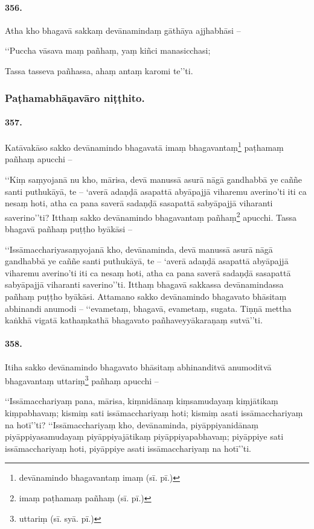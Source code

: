 \paragraph{356.} Atha kho bhagavā sakkaṃ devānamindaṃ gāthāya ajjhabhāsi –

‘‘Puccha vāsava maṃ pañhaṃ, yaṃ kiñci manasicchasi;

Tassa tasseva pañhassa, ahaṃ antaṃ karomi te’’ti.

\subsubsection{Paṭhamabhāṇavāro niṭṭhito.}

\paragraph{357.} Katāvakāso sakko devānamindo bhagavatā imaṃ bhagavantaṃ\footnote{devānamindo bhagavantaṃ imaṃ (sī. pī.)} paṭhamaṃ pañhaṃ apucchi –

‘‘Kiṃ saṃyojanā nu kho, mārisa, devā manussā asurā nāgā gandhabbā ye caññe santi puthukāyā, te – ‘averā adaṇḍā asapattā abyāpajjā viharemu averino’ti iti ca nesaṃ hoti, atha ca pana saverā sadaṇḍā sasapattā sabyāpajjā viharanti saverino’’ti? Itthaṃ sakko devānamindo bhagavantaṃ pañhaṃ\footnote{imaṃ paṭhamaṃ pañhaṃ (sī. pī.)} apucchi. Tassa bhagavā pañhaṃ puṭṭho byākāsi –

‘‘Issāmacchariyasaṃyojanā kho, devānaminda, devā manussā asurā nāgā gandhabbā ye caññe santi puthukāyā, te – ‘averā adaṇḍā asapattā abyāpajjā viharemu averino’ti iti ca nesaṃ hoti, atha ca pana saverā sadaṇḍā sasapattā sabyāpajjā viharanti saverino’’ti. Itthaṃ bhagavā sakkassa devānamindassa pañhaṃ puṭṭho byākāsi. Attamano sakko devānamindo bhagavato bhāsitaṃ abhinandi anumodi – ‘‘evametaṃ, bhagavā, evametaṃ, sugata. Tiṇṇā mettha kaṅkhā vigatā kathaṃkathā bhagavato pañhaveyyākaraṇaṃ sutvā’’ti.

\paragraph{358.} Itiha sakko devānamindo bhagavato bhāsitaṃ abhinanditvā anumoditvā bhagavantaṃ uttariṃ\footnote{uttariṃ (sī. syā. pī.)} pañhaṃ apucchi –

‘‘Issāmacchariyaṃ pana, mārisa, kiṃnidānaṃ kiṃsamudayaṃ kiṃjātikaṃ kiṃpabhavaṃ; kismiṃ sati issāmacchariyaṃ hoti; kismiṃ asati issāmacchariyaṃ na hotī’’ti? ‘‘Issāmacchariyaṃ kho, devānaminda, piyāppiyanidānaṃ piyāppiyasamudayaṃ piyāppiyajātikaṃ piyāppiyapabhavaṃ; piyāppiye sati issāmacchariyaṃ hoti, piyāppiye asati issāmacchariyaṃ na hotī’’ti.

